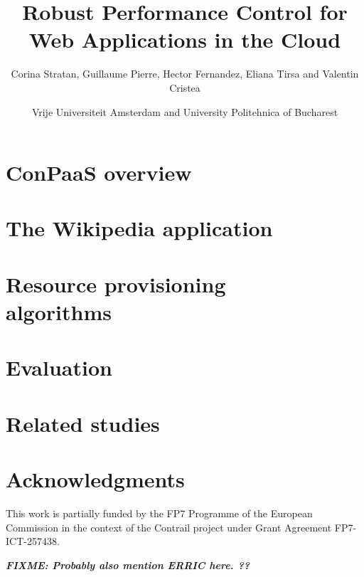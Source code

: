 \documentclass[10pt,twocolumn]{article}
\newcommand{\fixme}[1]
{
  \noindent
  \begin{boxedminipage}{\linewidth}
    \textsl{{\bf FIXME: #1}}
  \end{boxedminipage}
}
\begin{document}
\begin{multicols}{2}
\title{Robust Performance Control for Web Applications in the Cloud}
\author{Corina Stratan, Guillaume Pierre, Hector Fernandez, Eliana Tirsa and Valentin Cristea} 
\date{Vrije Universiteit Amsterdam and University Politehnica of Bucharest}
\maketitle
\end{multicols}




\section*{ConPaaS overview \label{conpaas}}



\section*{The Wikipedia application \label{wikipedia}}



\section*{Resource provisioning \\algorithms \label{provisioning}}



\section*{Evaluation \label{experiments}}



\section*{Related studies \label{studies}}







\section*{Acknowledgments}

This work is partially funded by the FP7 Programme of the European
Commission in the context of the Contrail project under Grant
Agreement FP7-ICT-257438.

\fixme{Probably also mention ERRIC here. ??}




\end{document}
